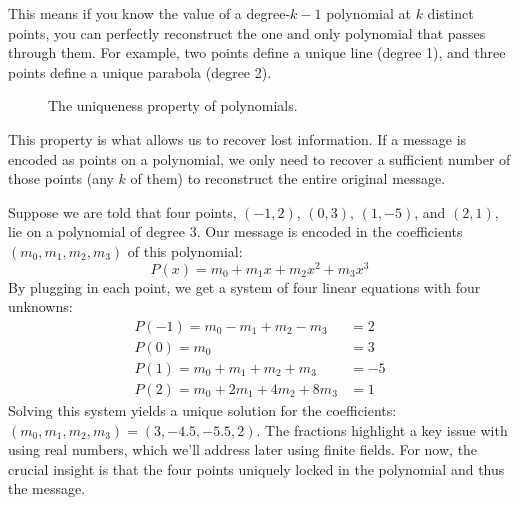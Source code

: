 \documentclass{article}
\begin{document}
This means if you know the value of a degree-$k-1$ polynomial at $k$ distinct points, you can perfectly reconstruct the one and only polynomial that passes through them. For example, two points define a unique line (degree 1), and three points define a unique parabola (degree 2).

\begin{figure}[h!]
\centering
{}
\caption{The uniqueness property of polynomials.}
\end{figure}

This property is what allows us to recover lost information. If a message is encoded as points on a polynomial, we only need to recover a sufficient number of those points (any $k$ of them) to reconstruct the entire original message.

\begin{tcolorbox}[title={Example: Reconstructing a Polynomial}]
Suppose we are told that four points, $(-1, 2)$, $(0, 3)$, $(1, -5)$, and $(2, 1)$, lie on a polynomial of degree 3. Our message is encoded in the coefficients $(m_0, m_1, m_2, m_3)$ of this polynomial:
\[ P(x) = m_0 + m_1 x + m_2 x^2 + m_3 x^3 \]
By plugging in each point, we get a system of four linear equations with four unknowns:
\begin{align*}
P(-1) = m_0 - m_1 + m_2 - m_3 &= 2 \\
P(0)  = m_0 &= 3 \\
P(1)  = m_0 + m_1 + m_2 + m_3 &= -5 \\
P(2)  = m_0 + 2m_1 + 4m_2 + 8m_3 &= 1
\end{align*}
Solving this system yields a unique solution for the coefficients: $(m_0, m_1, m_2, m_3) = (3, -4.5, -5.5, 2)$. The fractions highlight a key issue with using real numbers, which we'll address later using finite fields. For now, the crucial insight is that the four points uniquely locked in the polynomial and thus the message.
\end{tcolorbox}
\end{document}
